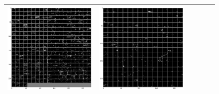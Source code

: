 \begin{figure}[!htb]
\begin{center}
\begin{tabular}{|c|c|c|c|c|c|}
\includegraphics[scale=0.1]{sunny2_caffe_conv4_fm.png} &
\includegraphics[scale=0.1]{sunny2_caffe_conv5_fm.png}\\ \hline\hline


\end{tabular}
\end{center}
\end{figure}
